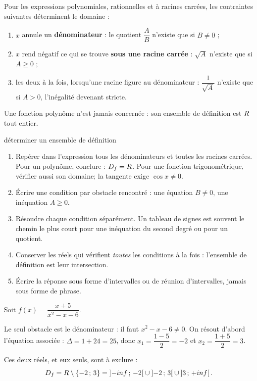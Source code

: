 \begin{propriete}
Pour les expressions polynomiales, rationnelles et à racines carrées,
les contraintes suivantes déterminent le domaine :
\begin{enumerate}[label=\textbf{\alph*)}, leftmargin=1.8em, itemsep=0.2em]
  \item $x$ annule un \textbf{dénominateur} : le quotient $\dfrac{A}{B}$
        n'existe que si $B \neq 0$ ;
  \item $x$ rend négatif ce qui se trouve \textbf{sous une racine carrée} :
        $\sqrt{A}$ n'existe que si $A \geq 0$ ;
  \item les deux à la fois, lorsqu'une racine figure au dénominateur :
        $\dfrac{1}{\sqrt{A}}$ n'existe que si $A > 0$, l'inégalité devenant
        stricte.
\end{enumerate}
Une fonction polynôme n'est jamais concernée : son ensemble de définition
est $R$ tout entier.
\end{propriete}

\begin{methode}{déterminer un ensemble de définition}
\begin{enumerate}[label=\textbf{\arabic*.}, leftmargin=1.6em, itemsep=0.2em]
  \item Repérer dans l'expression tous les dénominateurs et toutes les
        racines carrées. Pour un polynôme, conclure : $D_f=R$. Pour une fonction trigonométrique, vérifier aussi son domaine; la tangente exige $\cos x\ne0$.
  \item Écrire une condition par obstacle rencontré : une équation
        $B \neq 0$, une inéquation $A \geq 0$.
  \item Résoudre chaque condition séparément. Un tableau de signes est
        souvent le chemin le plus court pour une inéquation du second degré
        ou pour un quotient.
  \item Conserver les réels qui vérifient \emph{toutes} les conditions à la
        fois : l'ensemble de définition est leur intersection.
  \item Écrire la réponse sous forme d'intervalles ou de réunion
        d'intervalles, jamais sous forme de phrase.
\end{enumerate}
\end{methode}

\begin{exemple}[un quotient]
Soit $f(x) = \dfrac{x+5}{x^{2} - x - 6}$.

Le seul obstacle est le dénominateur : il faut $x^{2} - x - 6 \neq 0$. On
résout d'abord l'équation associée : $\Delta = 1 + 24 = 25$, donc
$x_{1} = \dfrac{1-5}{2} = -2$ et $x_{2} = \dfrac{1+5}{2} = 3$.

Ces deux réels, et eux seuls, sont à exclure :
\[
  D_{f} = R \setminus \{-2\,;\,3\}
          = \left]-inf\,;\,-2\right[ \cup \left]-2\,;\,3\right[
            \cup \left]3\,;\,+inf\right[.
\]
\end{exemple}

